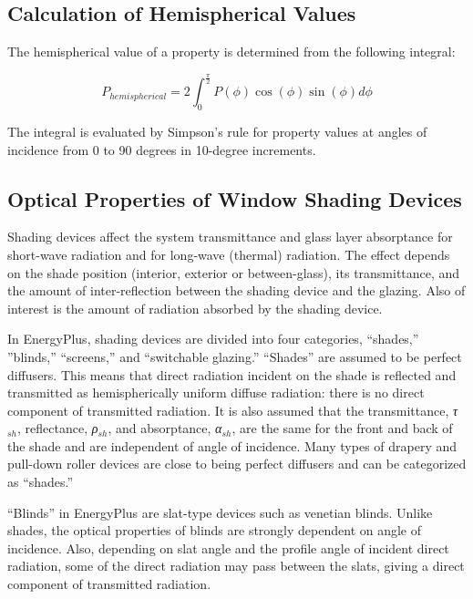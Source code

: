\subsection{Calculation of Hemispherical Values}\label{calculation-of-hemispherical-values}

The hemispherical value of a property is determined from the following integral:

\begin{equation}
{P_{hemispherical}} = 2\int_0^{\frac{\pi }{2}} {P(\phi )\cos (\phi )\sin (\phi )d\phi }
\end{equation}

The integral is evaluated by Simpson's rule for property values at angles of incidence from 0 to 90 degrees in 10-degree increments.

\subsection{Optical Properties of Window Shading Devices}\label{optical-properties-of-window-shading-devices}

Shading devices affect the system transmittance and glass layer absorptance for short-wave radiation and for long-wave (thermal) radiation. The effect depends on the shade position (interior, exterior or between-glass), its transmittance, and the amount of inter-reflection between the shading device and the glazing. Also of interest is the amount of radiation absorbed by the shading device.

In EnergyPlus, shading devices are divided into four categories, ``shades,'' ''blinds,'' ``screens,'' and ``switchable glazing.'' ``Shades'' are assumed to be perfect diffusers. This means that direct radiation incident on the shade is reflected and transmitted as hemispherically uniform diffuse radiation: there is no direct component of transmitted radiation. It is also assumed that the transmittance, \emph{τ\(_{sh}\)}, reflectance, \emph{ρ\(_{sh}\)}, and absorptance, \emph{α\(_{sh}\)}, are the same for the front and back of the shade and are independent of angle of incidence. Many types of drapery and pull-down roller devices are close to being perfect diffusers and can be categorized as ``shades.''

``Blinds'' in EnergyPlus are slat-type devices such as venetian blinds. Unlike shades, the optical properties of blinds are strongly dependent on angle of incidence. Also, depending on slat angle and the profile angle of incident direct radiation, some of the direct radiation may pass between the slats, giving a direct component of transmitted radiation.

